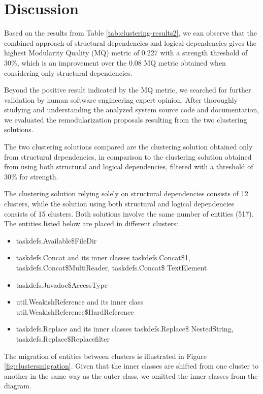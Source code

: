 \documentclass[conference, a4paper]{IEEEtran}
\begin{document}
\section{Discussion}
\label{discussion}

Based on the results from Table \ref{tab:clustering-results2}, we can observe that the combined approach of structural dependencies and logical dependencies gives the highest Modularity Quality (MQ) metric of 0.227 with a strength threshold of 30\%, which is an improvement over the 0.08 MQ metric obtained when considering only structural dependencies.

Beyond the positive result indicated by the MQ metric, we searched for further validation by human software engineering expert opinion. After thoroughly studying and understanding the analyzed system source code and documentation, we evaluated the remodularization proposals resulting from the two clustering solutions.

The two clustering solutions compared are the clustering solution obtained only from structural dependencies, in comparison to the clustering solution obtained from using both structural and logical dependencies, filtered with a threshold of 30\% for strength.

The clustering solution relying solely on structural dependencies consists of 12 clusters, while the solution using both structural and logical dependencies consists of 15 clusters. Both solutions involve the same number of entities (517). The entities listed below are placed in different clusters:

\begin{itemize}
    \item taskdefs.Available\$FileDir
    \item taskdefs.Concat and its inner classes taskdefs.Concat\$1, taskdefs.Concat\$MultiReader, taskdefs.Concat\$ TextElement
    \item taskdefs.Javadoc\$AccessType
    \item util.WeakishReference and its inner class util.WeakishReference\$HardReference
    \item taskdefs.Replace and its inner classes taskdefs.Replace\$ NestedString, taskdefs.Replace\$Replacefilter
\end{itemize}

The migration of entities between clusters is illustrated in Figure \ref{fig:clustersmigration}. Given that the inner classes are shifted from one cluster to another in the same way as the outer class, we omitted the inner classes from the diagram.
\end{document}
